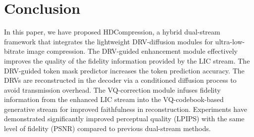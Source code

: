 \section{Conclusion}
\label{sec:conclusion}
In this paper, we have proposed HDCompression, a hybrid dual-stream framework that integrates the lightweight DRV-diffusion modules for ultra-low-bitrate image compression. The DRV-guided enhancement module effectively improves the quality of the fidelity information provided by the LIC stream. The DRV-guided token mask predictor increases the token prediction accuracy. The DRVs are reconstructed in the decoder via a conditioned diffusion process to avoid transmission overhead. The VQ-correction module infuses fidelity information from the enhanced LIC stream into the VQ-codebook-based generative stream for improved faithfulness in reconstruction.  Experiments have demonstrated significantly improved perceptual quality (LPIPS) with the same level of fidelity (PSNR) compared to previous dual-stream methods.